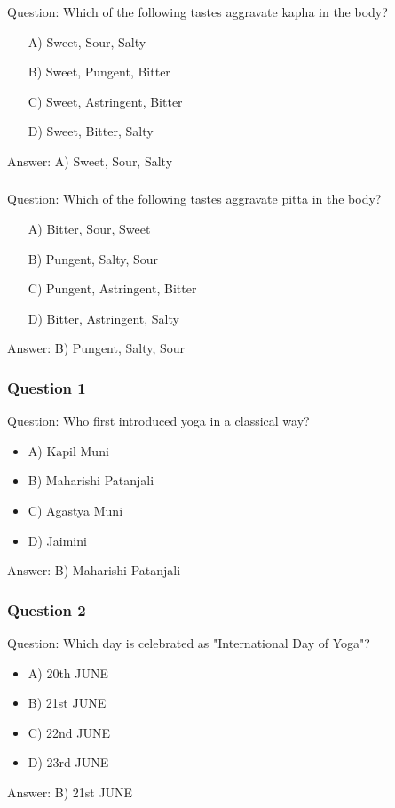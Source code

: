 \begin{frame}[fragile]\frametitle{}

Question: Which of the following tastes aggravate kapha in the body?

\begin{itemize}
\item[A)] Sweet, Sour, Salty
\item[B)] Sweet, Pungent, Bitter
\item[C)] Sweet, Astringent, Bitter
\item[D)] Sweet, Bitter, Salty
\end{itemize}

Answer: A) Sweet, Sour, Salty
\end{frame}

\begin{frame}[fragile]\frametitle{}

Question: Which of the following tastes aggravate pitta in the body?

\begin{itemize}
\item[A)] Bitter, Sour, Sweet
\item[B)] Pungent, Salty, Sour
\item[C)] Pungent, Astringent, Bitter
\item[D)] Bitter, Astringent, Salty
\end{itemize}

Answer: B) Pungent, Salty, Sour
\end{frame}

\begin{frame}[fragile]\frametitle{Question 1}
Question: Who first introduced yoga in a classical way?
\begin{itemize}
\item A) Kapil Muni
\item B) Maharishi Patanjali
\item C) Agastya Muni
\item D) Jaimini
\end{itemize}
Answer: B) Maharishi Patanjali
\end{frame}

\begin{frame}[fragile]\frametitle{Question 2}
Question: Which day is celebrated as "International Day of Yoga"?
\begin{itemize}
\item A) 20th JUNE
\item B) 21st JUNE
\item C) 22nd JUNE
\item D) 23rd JUNE
\end{itemize}
Answer: B) 21st JUNE
\end{frame}

